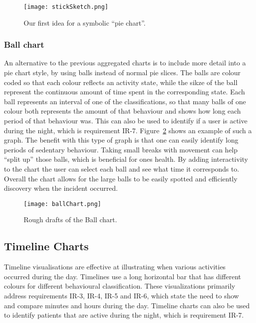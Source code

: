 \begin{figure}[h!]
	\centering
		\texttt{[image: stickSketch.png]}
		\caption[F2 sketch]{Our first idea for a symbolic ``pie chart''.}
		\label{fig:symbolicPie}
\end{figure}

\subsubsection{Ball chart}
An alternative to the previous aggregated charts is to include more detail into a pie chart style, by using balls instead of normal pie slices. The balls are colour coded so that each colour reflects an activity state, while the sikze of the ball represent the continuous amount of time spent in the corresponding state. Each ball represents an interval of one of the classifications, so that many balls of one colour both represents the amount of that behaviour and shows how long each period of that behaviour was. This can also be used to identify if a user is active during the night, which is requirement IR-7. Figure~\ref{fig:ballChart} shows an example of such a graph. The benefit with this type of graph is that one can easily identify long periods of sedentary behaviour. Taking small breaks with movement can help ``split up'' those balls, which is beneficial for ones health. By adding interactivity to the chart the user can select each ball and see what time it corresponds to. Overall the chart allows for the large balls to be easily spotted and efficiently discovery when the incident occurred.


\begin{figure}[h!]
	\centering
		\texttt{[image: ballChart.png]}
		\caption[F3 sketch]{Rough drafts of the Ball chart.}
		\label{fig:ballChart}
\end{figure}

\subsection{Timeline Charts}
Timeline visualisations are effective at illustrating when various activities occurred during the day. Timelines use a long horizontal bar that has different colours for different behavioural classification. These visualizations primarily address requirements IR-3, IR-4, IR-5 and IR-6, which state the need to show and compare minutes and hours during the day. Timeline charts can also be used to identify patients that are active during the night, which is requirement IR-7.

